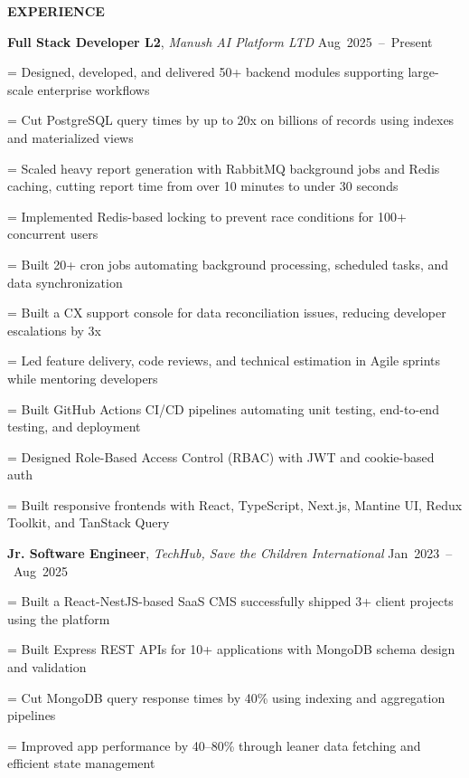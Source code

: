 \documentclass[a4paper]{article}
\newcommand{\sectionfont}{%
  \fontsize{12pt}{14pt}\selectfont\bfseries
}
\newlength{\listindent}
\newcommand{\sectiontitle}[1]{%
  \par
  \vspace{14pt}
  {\sectionfont #1}\par
  \vspace{6pt}
}
\newlength{\bulletgap}
\newcommand{\resumebullet}[1]{%
  \begingroup
  \leftskip=\listindent
  \parindent=0pt
  \noindent
  \llap{%
    \raisebox{0.15ex}{%
      \fontsize{7}{7}\selectfont -
    }%
    \hspace{6pt}%
  }%
  #1\par
  \endgroup
  \vspace{\bulletgap}%
}
\newcommand{\experienceheader}[3]{%
  \noindent
  \textbf{#1}, \textit{#2}%
  \hfill
  \mbox{#3}%
  \par
  \vspace{1pt}
}
\begin{document}
\sectiontitle{EXPERIENCE}

\experienceheader
{Full Stack Developer L2}
{Manush AI Platform LTD}
{Aug 2025 -- Present}

\resumebullet{Designed, developed, and delivered 50+ backend modules supporting large-scale enterprise workflows}

\resumebullet{Cut PostgreSQL query times by up to 20x on billions of records using indexes and materialized views}

\resumebullet{Scaled heavy report generation with RabbitMQ background jobs and Redis caching, cutting report time from over 10 minutes to under 30 seconds}



\resumebullet{Implemented Redis-based locking to prevent race conditions for 100+ concurrent users}

\resumebullet{Built 20+ cron jobs automating background processing, scheduled tasks, and data synchronization}

\resumebullet{Built a CX support console for data reconciliation issues, reducing developer escalations by 3x}

\resumebullet{Led feature delivery, code reviews, and technical estimation in Agile sprints while mentoring developers}

\resumebullet{Built GitHub Actions CI/CD pipelines automating unit testing, end-to-end testing, and deployment}

\resumebullet{Designed Role-Based Access Control (RBAC) with JWT and cookie-based auth}


\resumebullet{Built responsive frontends with React, TypeScript, Next.js, Mantine UI, Redux Toolkit, and TanStack Query}

\vspace{13pt}

\experienceheader
{Jr. Software Engineer}
{TechHub, Save the Children International}
{Jan 2023 -- Aug 2025}



\resumebullet{Built a React-NestJS-based SaaS CMS successfully shipped 3+ client projects using the platform}

\resumebullet{Built Express REST APIs for 10+ applications with MongoDB schema design and validation}

\resumebullet{Cut MongoDB query response times by 40\% using indexing and aggregation pipelines}

\resumebullet{Improved app performance by 40--80\% through leaner data fetching and efficient state management}
\end{document}

